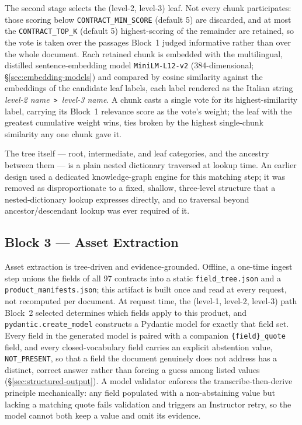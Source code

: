 The second stage selects the (level-2, level-3) leaf. Not every chunk participates: those scoring below \texttt{CONTRACT\_MIN\_SCORE} (default 5) are discarded, and at most the \texttt{CONTRACT\_TOP\_K} (default 5) highest-scoring of the remainder are retained, so the vote is taken over the passages Block~1 judged informative rather than over the whole document. Each retained chunk is embedded with the multilingual, distilled sentence-embedding model \texttt{MiniLM-L12-v2} (384-dimensional; \S\ref{sec:embedding-models}) \citep{reimers2026sentence} and compared by cosine similarity against the embeddings of the candidate leaf labels, each label rendered as the Italian string \emph{level-2 name}~\texttt{>}~\emph{level-3 name}. A chunk casts a single vote for its highest-similarity label, carrying its Block~1 relevance score as the vote's weight; the leaf with the greatest cumulative weight wins, ties broken by the highest single-chunk similarity any one chunk gave it. 

The tree itself — root, intermediate, and leaf categories, and the ancestry between them — is a plain nested dictionary traversed at lookup time. An earlier design used a dedicated knowledge-graph engine for this matching step; it was removed as disproportionate to a fixed, shallow, three-level structure that a nested-dictionary lookup expresses directly, and no traversal beyond ancestor/descendant lookup was ever required of it.

\subsection{Block 3 --- Asset Extraction}
\label{sec:bulk-insert-block3}

Asset extraction is tree-driven and evidence-grounded. Offline, a one-time ingest step unions the fields of all 97 contracts into a static \texttt{field\_tree.json} and a \texttt{product\_manifests.json}; this artifact is built once and read at every request, not recomputed per document. At request time, the (level-1, level-2, level-3) path Block~2 selected determines which fields apply to this product, and \texttt{pydantic.create\_model} constructs a Pydantic model for exactly that field set. Every field in the generated model is paired with a companion \texttt{\{field\}\_quote} field, and every closed-vocabulary field carries an explicit abstention value, \texttt{NOT\_PRESENT}, so that a field the document genuinely does not address has a distinct, correct answer rather than forcing a guess among listed values (\S\ref{sec:structured-output}). A model validator enforces the transcribe-then-derive principle mechanically: any field populated with a non-abstaining value but lacking a matching quote fails validation and triggers an Instructor retry, so the model cannot both keep a value and omit its evidence.

